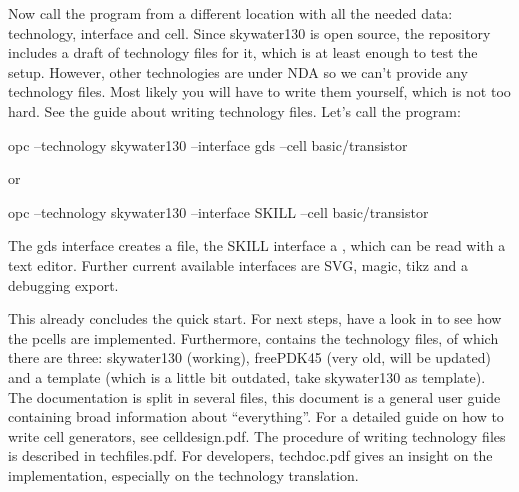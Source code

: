 Now call the program from a different location with all the needed data: technology, interface and cell. Since skywater130 is open source, the repository includes a
draft of technology files for it, which is at least enough to test the setup. However, other technologies are under NDA so we can't provide any technology files.
Most likely you will have to write them yourself, which is not too hard. See the guide about writing technology files. Let's call the program:
\begin{shellcode}
    opc --technology skywater130 --interface gds --cell basic/transistor
\end{shellcode}
or
\begin{shellcode}
    opc --technology skywater130 --interface SKILL --cell basic/transistor
\end{shellcode}
The gds interface creates a  file, the SKILL interface a , which can be read with a text editor. Further
current available interfaces are SVG, magic, tikz and a debugging export.

This already concludes the quick start. For next steps, have a look in  to see how the pcells are implemented. Furthermore, 
contains the technology files, of which there are three: skywater130 (working), freePDK45 (very old, will be updated) and a template (which is a little bit outdated,
take skywater130 as template). The documentation is split in several files, this document is a general user guide containing broad information about
\enquote{everything}. For a detailed guide on how to write cell generators, see celldesign.pdf. The procedure of writing technology files is described in
techfiles.pdf. For developers, techdoc.pdf gives an insight on the implementation, especially on the technology translation.

